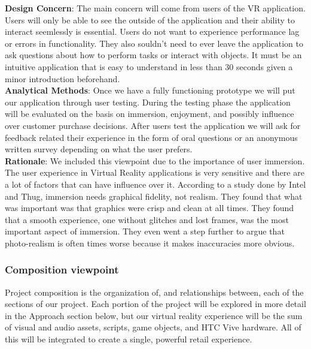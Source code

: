 \documentclass[10pt,journal,compsoc,onecolumn, draftclsnofoot]{IEEEtran}
\begin{document}
\hangindent=0.5cm \textbf{Design Concern}: The main concern will come from
users of the VR application. Users will only be able to see the outside of the
application and their ability to interact seemlessly is essential. Users do not
want to experience performance lag or errors in functionality. They also
souldn't need to ever leave the application to ask questions about how to
perform tasks or interact with objects. It must be an intuitive application
that is easy to understand in less than 30 seconds given a minor introduction
beforehand. \\

\hangindent=0.5cm \textbf{Analytical Methods}: Once we have a fully functioning
prototype we will put our application through user testing. During the testing
phase the application will be evaluated on the basis on immersion, enjoyment,
and possibly influence over customer purchase decisions. After users test the
application we will ask for feedback related their experience in the form of
oral questions or an anonymous written survey depending on what the user
prefers. \\

\hangindent=0.5cm \textbf{Rationale}: We included this viewpoint due to the importance of user immersion. The user experience in Virtual Reality applications is very sensitive and there are a lot of factors that can have influence over it. According to a study done by Intel and Thug\cite{michalak_lind_round1}, immersion needs graphical fidelity, not realism. They found that what was important was that graphics were crisp and clean at all times. They found that a smooth experience, one without glitches and lost frames, was the most important aspect of immersion. They even went a step further to argue that photo-realism is often times worse because it makes inaccuracies more obvious. \\

\subsubsection{Composition viewpoint}
Project composition is the organization of, and relationships between, each of
the sections of our project. Each portion of the project will be explored in
more detail in the Approach section below, but our virtual reality experience
will be the sum of visual and audio assets, scripts, game objects, and HTC Vive
hardware. All of this will be integrated to create a single, powerful retail
experience.\\
\end{document}

